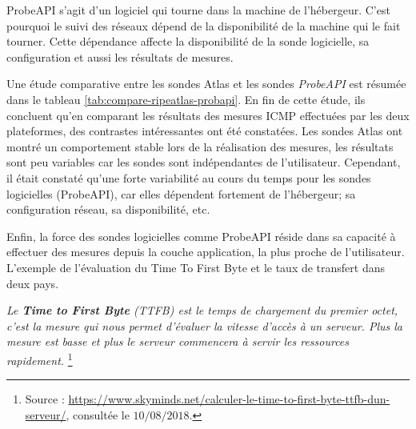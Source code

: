 ProbeAPI s'agit d'un logiciel qui tourne dans la machine de l'hébergeur. C'est pourquoi le suivi des réseaux dépend de la disponibilité de la machine qui le fait  tourner. Cette dépendance  affecte la disponibilité de la sonde logicielle, sa configuration et aussi les résultats de mesures.

Une étude comparative \cite{COMPARE-ATLAS-PROBEAPI}  entre les sondes  Atlas et les sondes \textit{ProbeAPI} est résumée dans le tableau \ref{tab:compare-ripeatlas-probapi}. 
En fin de cette étude, ils concluent qu'en comparant les résultats des mesures ICMP effectuées par les deux plateformes, des contrastes intéressantes ont été constatées.  Les sondes Atlas ont montré un comportement stable lors de la réalisation  des mesures, les résultats sont peu variables car les sondes sont indépendantes de l'utilisateur. Cependant, il était constaté qu'une forte variabilité au cours du temps pour les sondes logicielles (ProbeAPI), car elles dépendent fortement de l'hébergeur; sa configuration réseau, sa disponibilité, etc.

Enfin, la force des sondes logicielles comme  ProbeAPI réside dans sa capacité  à effectuer des mesures depuis la couche application, la plus proche de l'utilisateur. L'exemple de l'évaluation du Time To First Byte et le taux de transfert dans deux pays.

\begin{tcolorbox}
	\og \textit{	Le \textbf{Time to First Byte} (TTFB) est le temps de chargement du premier octet, c'est la mesure qui nous permet d'évaluer la vitesse d'accès à un serveur. Plus la mesure est basse et plus le serveur commencera à servir les ressources rapidement.} \fg{} \footnote{Source : \url{https://www.skyminds.net/calculer-le-time-to-first-byte-ttfb-dun-serveur/}, consultée le $10/08/2018$.}
\end{tcolorbox}

